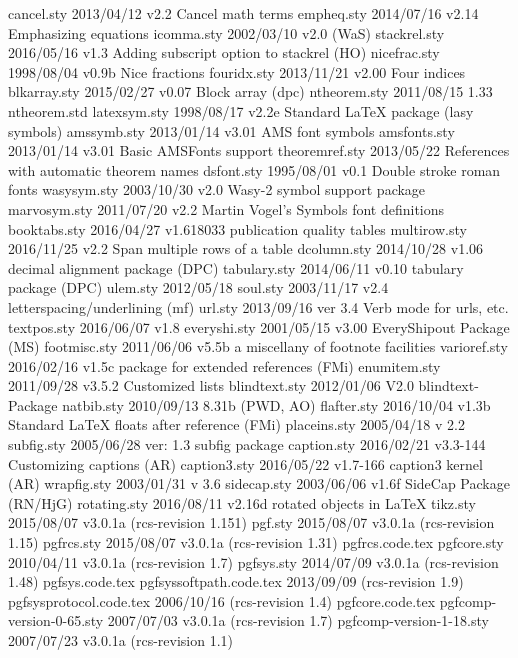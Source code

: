   cancel.sty    2013/04/12 v2.2 Cancel math terms
  empheq.sty    2014/07/16 v2.14 Emphasizing equations
  icomma.sty    2002/03/10 v2.0 (WaS)
stackrel.sty    2016/05/16 v1.3 Adding subscript option to stackrel (HO)
nicefrac.sty    1998/08/04 v0.9b Nice fractions
 fouridx.sty    2013/11/21 v2.00 Four indices
blkarray.sty    2015/02/27 v0.07 Block array (dpc)
ntheorem.sty    2011/08/15 1.33
ntheorem.std
latexsym.sty    1998/08/17 v2.2e Standard LaTeX package (lasy symbols)
 amssymb.sty    2013/01/14 v3.01 AMS font symbols
amsfonts.sty    2013/01/14 v3.01 Basic AMSFonts support
theoremref.sty    2013/05/22 References with automatic theorem names
  dsfont.sty    1995/08/01 v0.1 Double stroke roman fonts
 wasysym.sty    2003/10/30 v2.0 Wasy-2 symbol support package
marvosym.sty    2011/07/20 v2.2 Martin Vogel's Symbols font definitions
booktabs.sty    2016/04/27 v1.618033 publication quality tables
multirow.sty    2016/11/25 v2.2 Span multiple rows of a table
 dcolumn.sty    2014/10/28 v1.06 decimal alignment package (DPC)
tabulary.sty    2014/06/11 v0.10 tabulary package (DPC)
    ulem.sty    2012/05/18
    soul.sty    2003/11/17 v2.4 letterspacing/underlining (mf)
     url.sty    2013/09/16  ver 3.4  Verb mode for urls, etc.
 textpos.sty    2016/06/07 v1.8
everyshi.sty    2001/05/15 v3.00 EveryShipout Package (MS)
footmisc.sty    2011/06/06 v5.5b a miscellany of footnote facilities
varioref.sty    2016/02/16 v1.5c package for extended references (FMi)
enumitem.sty    2011/09/28 v3.5.2 Customized lists
blindtext.sty    2012/01/06 V2.0 blindtext-Package
  natbib.sty    2010/09/13 8.31b (PWD, AO)
 flafter.sty    2016/10/04 v1.3b Standard LaTeX floats after reference (FMi)
placeins.sty    2005/04/18  v 2.2
  subfig.sty    2005/06/28 ver: 1.3 subfig package
 caption.sty    2016/02/21 v3.3-144 Customizing captions (AR)
caption3.sty    2016/05/22 v1.7-166 caption3 kernel (AR)
 wrapfig.sty    2003/01/31  v 3.6
 sidecap.sty    2003/06/06 v1.6f SideCap Package (RN/HjG)
rotating.sty    2016/08/11 v2.16d rotated objects in LaTeX
    tikz.sty    2015/08/07 v3.0.1a (rcs-revision 1.151)
     pgf.sty    2015/08/07 v3.0.1a (rcs-revision 1.15)
  pgfrcs.sty    2015/08/07 v3.0.1a (rcs-revision 1.31)
  pgfrcs.code.tex
 pgfcore.sty    2010/04/11 v3.0.1a (rcs-revision 1.7)
  pgfsys.sty    2014/07/09 v3.0.1a (rcs-revision 1.48)
  pgfsys.code.tex
pgfsyssoftpath.code.tex    2013/09/09  (rcs-revision 1.9)
pgfsysprotocol.code.tex    2006/10/16  (rcs-revision 1.4)
 pgfcore.code.tex
pgfcomp-version-0-65.sty    2007/07/03 v3.0.1a (rcs-revision 1.7)
pgfcomp-version-1-18.sty    2007/07/23 v3.0.1a (rcs-revision 1.1)
